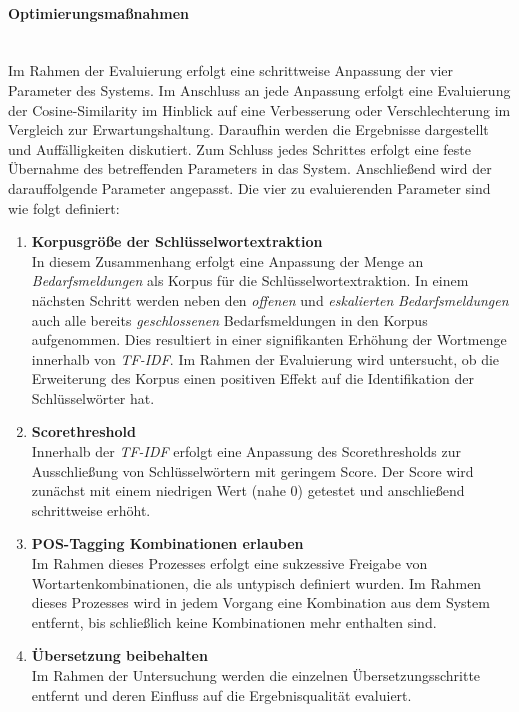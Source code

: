 \paragraph{Optimierungsmaßnahmen}\label{sec:optimierungsmaßnahmen}\mbox{}\\
Im Rahmen der Evaluierung erfolgt eine schrittweise Anpassung der vier Parameter des Systems. Im Anschluss an jede Anpassung erfolgt eine Evaluierung der Cosine-Similarity im Hinblick auf eine Verbesserung oder Verschlechterung im Vergleich zur Erwartungshaltung. Daraufhin werden die Ergebnisse dargestellt und Auffälligkeiten diskutiert. Zum Schluss jedes Schrittes erfolgt eine feste Übernahme des betreffenden Parameters in das System. Anschließend wird der darauffolgende Parameter angepasst. Die vier zu evaluierenden Parameter sind wie folgt definiert:
\begin{enumerate}
	\item \textbf{Korpusgröße der Schlüsselwortextraktion} \\ In diesem Zusammenhang erfolgt eine Anpassung der Menge an \emph{Bedarfsmeldungen} als Korpus für die Schlüsselwortextraktion. In einem nächsten Schritt werden neben den \emph{offenen} und \emph{eskalierten} \emph{Bedarfsmeldungen} auch alle bereits \emph{geschlossenen} Bedarfsmeldungen in den Korpus aufgenommen. Dies resultiert in einer signifikanten Erhöhung der Wortmenge innerhalb von \emph{TF-IDF}. Im Rahmen der Evaluierung wird untersucht, ob die Erweiterung des Korpus einen positiven Effekt auf die Identifikation der Schlüsselwörter hat.
	\item \textbf{Scorethreshold} \\ Innerhalb der \emph{TF-IDF} erfolgt eine Anpassung des Scorethresholds zur Ausschließung von Schlüsselwörtern mit geringem Score. Der Score wird zunächst mit einem niedrigen Wert (nahe 0) getestet und anschließend schrittweise erhöht.
	\item \textbf{POS-Tagging Kombinationen erlauben} \\ Im Rahmen dieses Prozesses erfolgt eine sukzessive Freigabe von Wortartenkombinationen, die als untypisch definiert wurden. Im Rahmen dieses Prozesses wird in jedem Vorgang eine Kombination aus dem System entfernt, bis schließlich keine Kombinationen mehr enthalten sind.
	\item \textbf{Übersetzung beibehalten} \\ Im Rahmen der Untersuchung werden die einzelnen Übersetzungsschritte entfernt und deren Einfluss auf die Ergebnisqualität evaluiert.
\end{enumerate}

